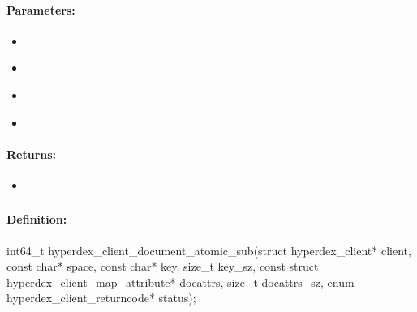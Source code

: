 \paragraph{Parameters:}
\begin{itemize}[noitemsep]
\item {}\\

\item {}\\

\item {}\\

\item {}\\

\end{itemize}

\paragraph{Returns:}
\begin{itemize}[noitemsep]
\item {}\\

\end{itemize}

\pagebreak
\subsubsection{}
\label{api:c:document_atomic_sub}


\paragraph{Definition:}
\begin{ccode}
int64_t hyperdex_client_document_atomic_sub(struct hyperdex_client* client,
        const char* space,
        const char* key, size_t key_sz,
        const struct hyperdex_client_map_attribute* docattrs, size_t docattrs_sz,
        enum hyperdex_client_returncode* status);
\end{ccode}

